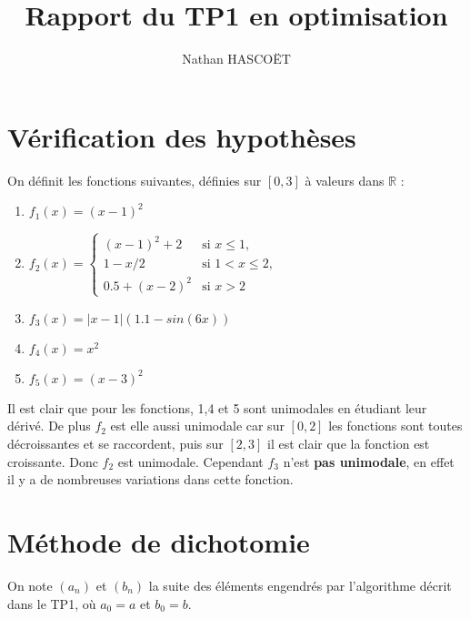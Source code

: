 \documentclass[12pt,a4paper]{article}
\author{Nathan HASCOËT}
\title{Rapport du TP1 en optimisation}
\begin{document}
	
\maketitle

\section{Vérification des hypothèses}

On définit les fonctions suivantes, définies sur $[0,3]$ à valeurs dans $\mathbb{R}$ :
\begin{enumerate}
	\item $f_1(x)=(x-1)^2$
	\item $f_2(x) = \begin{cases}
						(x-1)^2+2 & \text{si } x \leq 1,\\
						1-x/2  & \text{si } 1 < x \leq 2,\\
						0.5+(x-2)^2  & \text{si } x>2
					\end{cases}$
	\item $f_3(x) = |x-1|(1.1-sin(6x))$
	\item $f_4(x) = x^2$
	\item $f_5(x) = (x-3)^2$
\end{enumerate}

Il est clair que pour les fonctions, 1,4 et 5 sont unimodales en étudiant leur dérivé. De plus $f_2$ est elle aussi unimodale car sur $[0,2]$ les fonctions sont toutes décroissantes et se raccordent, puis sur $[2,3]$ il est clair que la fonction est croissante. Donc $f_2$ est unimodale. Cependant $f_3$ n'est \textbf{pas unimodale}, en effet il y a de nombreuses variations dans cette fonction.

\section{Méthode de dichotomie}

On note $(a_n)$ et $(b_n)$ la suite des éléments engendrés par l'algorithme décrit dans le TP1, où $a_0 = a$ et $b_0 = b$.
\end{document}
